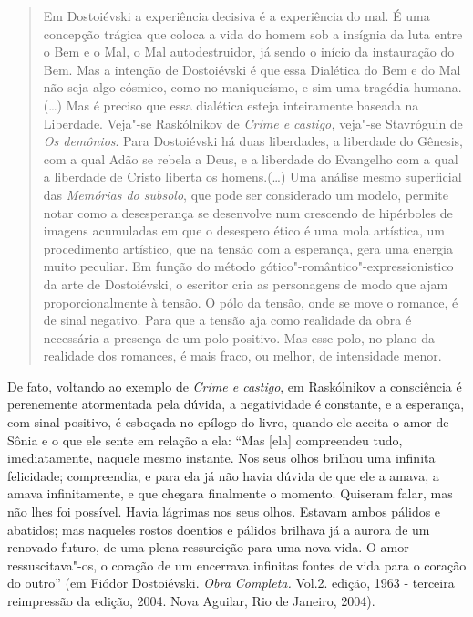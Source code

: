 \begin{quote}
Em Dostoiévski a experiência decisiva é a experiência do mal. É uma
concepção trágica que coloca a vida do homem sob a insígnia da luta
entre o Bem e o Mal, o Mal autodestruidor, já sendo o início da
instauração do Bem. Mas a intenção de Dostoiévski é que essa Dialética
do Bem e do Mal não seja algo cósmico, como no maniqueísmo, e sim uma
tragédia humana. (\ldots{}) Mas é preciso que essa
dialética esteja inteiramente baseada na Liberdade. Veja"-se Raskólnikov
de \emph{Crime e castigo,} veja"-se Stavróguin de \emph{Os
demônios}. Para Dostoiévski há duas liberdades, a liberdade do Gênesis,
com a qual Adão se rebela a Deus, e a liberdade do Evangelho com a qual a
liberdade de Cristo liberta os homens.(\ldots{}) Uma análise mesmo
superficial das \emph{Memórias do subsolo}, que pode ser considerado um
modelo, permite notar como a desesperança se desenvolve num crescendo de
hipérboles de imagens acumuladas em que o desespero ético é uma mola
artística, um procedimento artístico, que na tensão com a esperança,
gera uma energia muito peculiar. Em função do método
gótico"-romântico"-expressionistico da arte de Dostoiévski, o escritor
cria as personagens de modo que ajam proporcionalmente à tensão. O pólo
da tensão, onde se move o romance, é de sinal negativo. Para que a
tensão aja como realidade da obra é necessária a presença de um polo
positivo. Mas esse polo, no plano da realidade dos romances, é mais
fraco, ou melhor, de intensidade menor.
\end{quote}

De fato, voltando ao exemplo de \emph{Crime e castigo}, em Raskólnikov a
consciência é perenemente atormentada pela dúvida, a negatividade é
constante, e a esperança, com sinal positivo, é esboçada no epílogo do
livro, quando ele aceita o amor de Sônia e o que ele sente em relação a
ela: ``Mas [ela] compreendeu tudo, imediatamente, naquele mesmo
instante. Nos seus olhos brilhou uma infinita felicidade; compreendia, e
para ela já não havia dúvida de que ele a amava, a amava infinitamente,
e que chegara finalmente o momento. Quiseram falar, mas não lhes foi possível. Havia lágrimas nos seus
olhos. Estavam ambos pálidos e abatidos; mas naqueles rostos doentios e
pálidos brilhava já a aurora de um renovado futuro, de uma plena
ressureição para uma nova vida. O amor ressuscitava"-os, o coração de um
encerrava infinitas fontes de vida para o coração do outro'' (em Fiódor
Dostoiévski. \emph{Obra Completa.} Vol.2.  edição, 1963 - terceira
reimpressão da  edição, 2004. Nova Aguilar, Rio de Janeiro, 2004).

